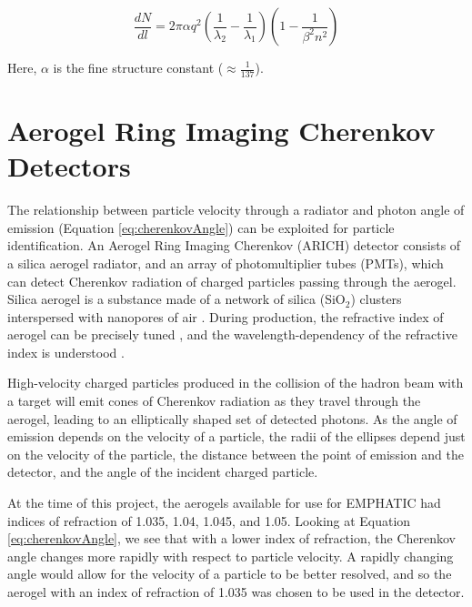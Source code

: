 \begin{equation}
    \label{eq:photonNumber}
    \frac{dN}{dl}  = 2\pi\alpha q^2 \left(\frac{1}{\lambda_2} - \frac{1}{\lambda_1}
    \right)\left(1 - \frac{1}{\beta^2n^2}\right)
\end{equation}

Here, $\alpha$ is the fine structure constant ($\approx \frac{1}{137}$).



\section{Aerogel Ring Imaging Cherenkov Detectors}
\label{sec:ARICH}
The relationship between particle velocity through a radiator and photon angle of emission (Equation \ref{eq:cherenkovAngle}) can be exploited for particle identification.
An Aerogel Ring Imaging Cherenkov (ARICH) detector consists of a silica aerogel radiator, and an array of photomultiplier tubes (PMTs), which can detect Cherenkov radiation of charged particles passing through the aerogel.
Silica aerogel is a substance made of a network of silica (SiO$_2$) clusters interspersed with nanopores of air \cite{aerogelRefraction}.
During production, the refractive index of aerogel can be precisely tuned \cite{aerogelRefraction}, and the wavelength-dependency of the refractive index is understood \cite{aerogelWavelength}. 



High-velocity charged particles produced in the collision of the hadron beam with a target will emit cones of Cherenkov radiation as they travel through the aerogel, leading to an elliptically shaped set of detected photons.
As the angle of emission depends on the velocity of a particle, the radii of the ellipses depend just on the velocity of the particle, the distance between the point of emission and the detector, and the angle of the incident charged particle.

At the time of this project, the aerogels available for use for EMPHATIC had indices of refraction of 1.035, 1.04, 1.045, and 1.05.
Looking at Equation \ref{eq:cherenkovAngle}, we see that with a lower index of refraction, the Cherenkov angle changes more rapidly with respect to particle velocity. 
A rapidly changing angle would allow for the velocity of a particle to be better resolved, and so the aerogel with an index of refraction of 1.035 was chosen to be used in the detector.

